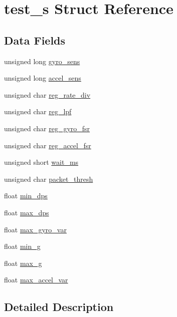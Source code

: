 \hypertarget{structtest__s}{}\section{test\+\_\+s Struct Reference}
\label{structtest__s}
\subsection*{Data Fields}
\begin{DoxyCompactItemize}
\item 
unsigned long \hyperlink{structtest__s_a32da1174cf6569aa99bdff70055bb45a}{gyro\+\_\+sens}
\item 
unsigned long \hyperlink{structtest__s_a22a1d8ebbceb431baa0dfdc911fbc8ab}{accel\+\_\+sens}
\item 
unsigned char \hyperlink{structtest__s_a82f9074fa4cc93f3d21f826a9e739294}{reg\+\_\+rate\+\_\+div}
\item 
unsigned char \hyperlink{structtest__s_a794ee75f43ca70e89a68b43642eb2c59}{reg\+\_\+lpf}
\item 
unsigned char \hyperlink{structtest__s_a6063bc7c719cdaddf88633b1148fd323}{reg\+\_\+gyro\+\_\+fsr}
\item 
unsigned char \hyperlink{structtest__s_a08dc2a906129744a045950c3642a9023}{reg\+\_\+accel\+\_\+fsr}
\item 
unsigned short \hyperlink{structtest__s_a0abed830f8dc38c7bd17ce78ee2530d8}{wait\+\_\+ms}
\item 
unsigned char \hyperlink{structtest__s_aa8dbf099c1734ea67c1ef1938c0baec8}{packet\+\_\+thresh}
\item 
float \hyperlink{structtest__s_a73ee82e1de6d3bdc4cc37282c012f0e1}{min\+\_\+dps}
\item 
float \hyperlink{structtest__s_a9085b0647fbd57e7ed8e0c4371ad1de2}{max\+\_\+dps}
\item 
float \hyperlink{structtest__s_a629a75454f5af8caaff2fe8388975d32}{max\+\_\+gyro\+\_\+var}
\item 
float \hyperlink{structtest__s_aa295cc026745ef7378eeff0c72638ed0}{min\+\_\+g}
\item 
float \hyperlink{structtest__s_a30dbaf47c9d41bf9e86370664d661bd0}{max\+\_\+g}
\item 
float \hyperlink{structtest__s_ad5bc54ab7d1b1a0f158ca1a79359c3bc}{max\+\_\+accel\+\_\+var}
\end{DoxyCompactItemize}


\subsection{Detailed Description}


